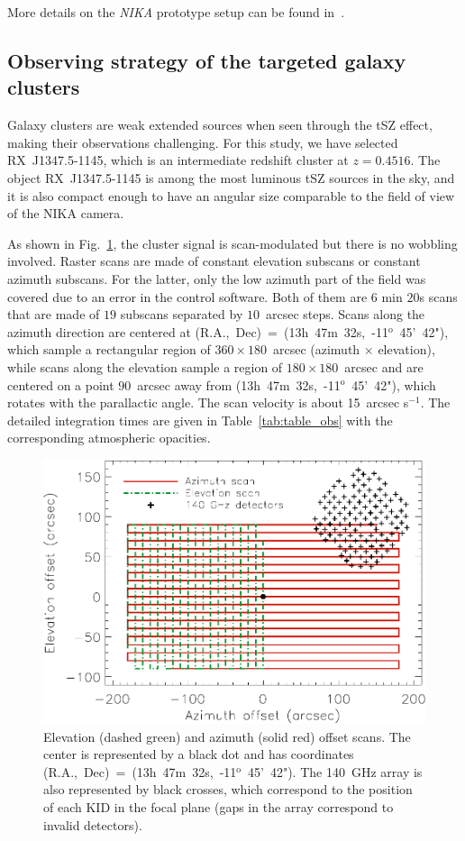 More details on the {\it NIKA} prototype setup can be found in~\cite{main_run5}.

\subsection{Observing strategy of the targeted galaxy clusters}
\label{sec:obs_condition}
Galaxy clusters are weak extended sources when seen through the tSZ effect, making their observations challenging.
For this study, we have selected \mbox{RX~J1347.5-1145}, which is an intermediate redshift cluster at $z = 0.4516$.
 The object \mbox{RX~J1347.5-1145} is among the most luminous tSZ sources in the sky, and
 it is also compact enough to have an angular size comparable to the field of view of the NIKA camera. 

As shown in Fig.~\ref{fig:scans}, the cluster signal is scan-modulated but there is no wobbling involved. Raster scans are made of constant elevation subscans or constant azimuth subscans. For the latter, only the low azimuth part of the field was covered due to an error in the control software. Both of them are $6$ min $20$s scans that are made of $19$ subscans separated by $10$~arcsec steps. Scans along the azimuth direction are centered at (R.A.,~Dec)~=~(13h~47m~32s,~-11$^{\mathrm{o}}$~45'~42"), which sample a rectangular region of $360 \times 180$~arcsec (azimuth $\times$ elevation), while scans along the elevation sample a region of $180 \times 180$~arcsec and are centered on a point $90$~arcsec away from (13h~47m~32s,~-11$^{\mathrm{o}}$~45'~42"), which rotates with the parallactic angle. The scan velocity is about 15~arcsec s$^{-1}$. The detailed integration times are given in Table~\ref{tab:table_obs} with the corresponding atmospheric opacities.
	\begin{figure}
	\centering
	\includegraphics[width=\columnwidth]{Figure/scan}
	\caption{Elevation (dashed green) and azimuth (solid red) offset scans. The center is represented by a black dot and has coordinates (R.A.,~Dec)~=~(13h~47m~32s,~-11$^{\mathrm{o}}$~45'~42"). The 140~GHz array is also represented by black crosses, which correspond to the position of each KID in the focal plane (gaps in the array correspond to invalid detectors).}
        \label{fig:scans}
	\end{figure}
	

